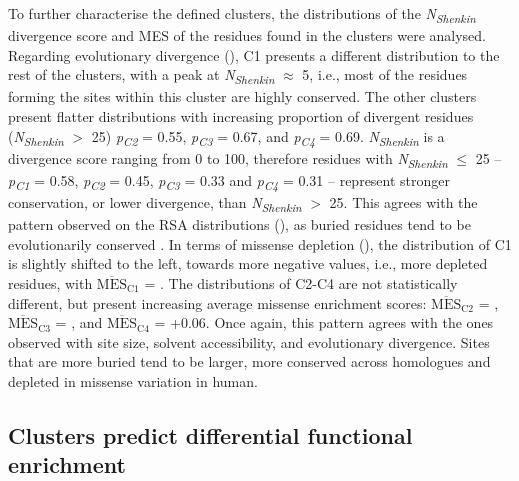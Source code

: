 {To further characterise the defined clusters, the distributions of the \textit{N\textsubscript{Shenkin}} divergence score and MES of the residues found in the clusters were analysed. Regarding evolutionary divergence (), C1 presents a different distribution to the rest of the clusters, with a peak at \textit{N\textsubscript{Shenkin}} $\approx$ 5, i.e., most of the residues forming the sites within this cluster are highly conserved. The other clusters present flatter distributions with increasing proportion of divergent residues (\textit{N\textsubscript{Shenkin}} $>$ 25) \textit{p\textsubscript{C2}} = 0.55,  \textit{p\textsubscript{C3}} = 0.67, and  \textit{p\textsubscript{C4}} = 0.69. \textit{N\textsubscript{Shenkin}} is a divergence score ranging from 0 to 100, therefore residues with \textit{N\textsubscript{Shenkin}} $\leq$ 25 -- \textit{p\textsubscript{C1}} = 0.58,  \textit{p\textsubscript{C2}} = 0.45,  \textit{p\textsubscript{C3}} = 0.33 and  \textit{p\textsubscript{C4}} = 0.31 -- represent stronger conservation, or lower divergence, than \textit{N\textsubscript{Shenkin}} $>$ 25. This agrees with the pattern observed on the RSA distributions (), as buried residues tend to be evolutionarily conserved \cite{RUSSELL_1994_UNCONSERVATION}. In terms of missense depletion (), the distribution of C1 is slightly shifted to the left, towards more negative values, i.e., more depleted residues, with $\overline{\text{MES}}_{\text{C1}}$ = . The distributions of C2-C4 are not statistically different, but present increasing average missense enrichment scores: $\overline{\text{MES}}_{\text{C2}}$ = , $\overline{\text{MES}}_{\text{C3}}$ = , and $\overline{\text{MES}}_{\text{C4}}$ = +0.06. Once again, this pattern agrees with the ones observed with site size, solvent accessibility, and evolutionary divergence. Sites that are more buried tend to be larger, more conserved across homologues and depleted in missense variation in human.


\subsection{Clusters predict differential functional enrichment}

}
